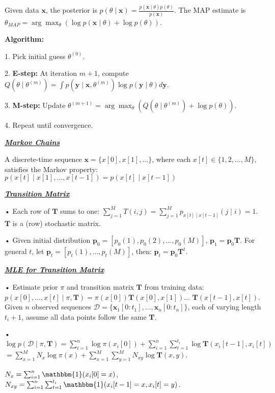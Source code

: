 \documentclass[10pt]{article}
\newcommand{\bulletPoint}[1]{\ul{\textit{\textbf{#1}}}}
\begin{document}
\begin{multicols*}{3}
Given data $\mathbf{x}$, the posterior is $p(\theta \mid \mathbf{x}) = \frac{p(\mathbf{x} \mid \theta) p(\theta)}{p(\mathbf{x})}$. The MAP estimate is $\theta_{MAP} = \arg\max_{\theta} \left( \log p(\mathbf{x} \mid \theta) + \log p(\theta) \right)$. 

\textbf{Algorithm:}

1. Pick initial guess $\theta^{(0)}$.

2. \textbf{E-step:} At iteration $m+1$, compute $Q(\theta \mid \theta^{(m)}) = \int p(\mathbf{y} \mid \mathbf{x}, \theta^{(m)}) \log p(\mathbf{y} \mid \theta) d\mathbf{y}$.

3. \textbf{M-step:} Update $\theta^{(m+1)} = \arg\max_{\theta} \left( Q(\theta \mid \theta^{(m)}) + \log p(\theta) \right)$.

4. Repeat until convergence. 

    
\bulletPoint{Markov Chains}\quad

A discrete-time sequence $\mathbf{x} = \{x[0], x[1], \dots\}$, where each $x[t] \in \{1, 2, \dots, M\}$, satisfies the Markov property:
$p(x[t] \mid x[1], \dots, x[t-1]) = p(x[t] \mid x[t-1])$

\bulletPoint{Transition Matrix}\quad

• Each row of $\mathbf{T}$ sums to one: $\sum_{j=1}^{M} T(i, j) = \sum_{j=1}^{M} p_{x[t] \mid x[t-1]}(j \mid i) = 1$.
$\mathbf{T}$ is a (row) stochastic matrix.

• Given initial distribution $\mathbf{p}_0 = [p_0(1), p_0(2), \dots, p_0(M)]$,  $\mathbf{p}_1 = \mathbf{p}_0 \mathbf{T}$. For general $t$, let $\mathbf{p}_t = [p_t(1), \dots, p_t(M)]$, then: $\mathbf{p}_t = \mathbf{p}_0 \mathbf{T}^t$.


\bulletPoint{MLE for Transition Matrix}\quad

• Estimate prior $\pi$ and transition matrix $\mathbf{T}$ from training data:
$p(x[0], \dots, x[t] \mid \pi, \mathbf{T}) = \pi(x[0]) \mathbf{T}(x[0], x[1])  \dots$ $\mathbf{T}(x[t-1], x[t])$.
Given $n$ observed sequences $\mathcal{D} = \{\mathbf{x}_1[0:t_1], \dots, \mathbf{x}_n[0:t_n]\}$, each of varying length $t_i+1$, assume all data points follow the same $\mathbf{T}$. 

• $\log p(\mathcal{D} \mid \pi, \mathbf{T}) = \sum_{i=1}^{n} \log \pi(x_i[0]) + \sum_{i=1}^{n} \sum_{t=1}^{t_i} \log \mathbf{T}(x_i[t-1], x_i[t])$
$= \sum_{x=1}^{M} N_x \log \pi(x) + \sum_{x=1}^{M} \sum_{y=1}^{M} N_{xy} \log \mathbf{T}(x, y)$. 

$N_x = \sum_{i=1}^{n} \mathbbm{1}(x_i[0] = x)$, $N_{xy} = \sum_{i=1}^{n} \sum_{t=1}^{t_i} \mathbbm{1}(x_i[t-1] = x, x_i[t] = y)$. 


\end{multicols*}
\end{document}
